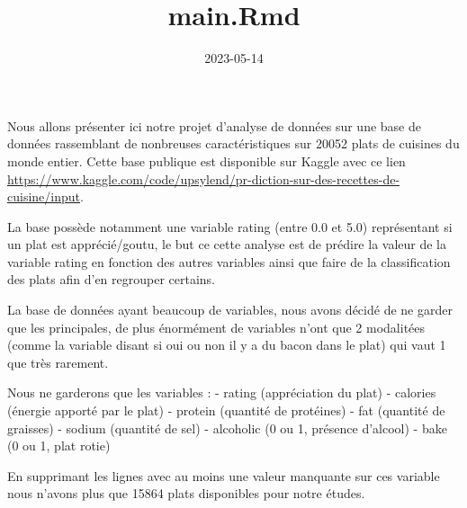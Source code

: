 \documentclass[
]{article}
\title{main.Rmd}
\author{}
\date{\vspace{-2.5em}2023-05-14}
\newenvironment{Shaded}{\begin{snugshade}}{\end{snugshade}}
\newcommand{\AttributeTok}[1]{\textcolor[rgb]{0.77,0.63,0.00}{#1}}
\newcommand{\CommentTok}[1]{\textcolor[rgb]{0.56,0.35,0.01}{\textit{#1}}}
\newcommand{\DecValTok}[1]{\textcolor[rgb]{0.00,0.00,0.81}{#1}}
\newcommand{\FunctionTok}[1]{\textcolor[rgb]{0.00,0.00,0.00}{#1}}
\newcommand{\NormalTok}[1]{#1}
\newcommand{\OtherTok}[1]{\textcolor[rgb]{0.56,0.35,0.01}{#1}}
\newcommand{\SpecialCharTok}[1]{\textcolor[rgb]{0.00,0.00,0.00}{#1}}
\newcommand{\StringTok}[1]{\textcolor[rgb]{0.31,0.60,0.02}{#1}}
\begin{document}
\maketitle

Nous allons présenter ici notre projet d'analyse de données sur une base
de données rassemblant de nonbreuses caractéristiques sur 20052 plats de
cuisines du monde entier. Cette base publique est disponible sur Kaggle
avec ce lien
\url{https://www.kaggle.com/code/upsylend/pr-diction-sur-des-recettes-de-cuisine/input}.

La base possède notamment une variable rating (entre 0.0 et 5.0)
représentant si un plat est apprécié/goutu, le but ce cette analyse est
de prédire la valeur de la variable rating en fonction des autres
variables ainsi que faire de la classification des plats afin d'en
regrouper certains.

La base de données ayant beaucoup de variables, nous avons décidé de ne
garder que les principales, de plus énormément de variables n'ont que 2
modalitées (comme la variable disant si oui ou non il y a du bacon dans
le plat) qui vaut 1 que très rarement.

Nous ne garderons que les variables : - rating (appréciation du plat) -
calories (énergie apporté par le plat) - protein (quantité de protéines)
- fat (quantité de graisses) - sodium (quantité de sel) - alcoholic (0
ou 1, présence d'alcool) - bake (0 ou 1, plat rotie)

En supprimant les lignes avec au moins une valeur manquante sur ces
variable nous n'avons plus que 15864 plats disponibles pour notre
études.

\begin{Shaded}
\end{Shaded}
\end{document}
